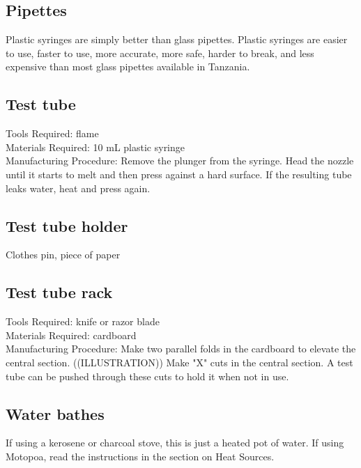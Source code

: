 \subsection{Pipettes}
Plastic syringes are simply better than glass pipettes. Plastic syringes are easier to use, faster to use, more accurate, more safe, harder to break, and less expensive than most glass pipettes available in Tanzania.

\subsection{Test tube}
Tools Required: flame\\
Materials Required: 10 mL plastic syringe\\
Manufacturing Procedure: Remove the plunger from the syringe. Head the nozzle until it starts to melt and then press against a hard surface. If the resulting tube leaks water, heat and press again.

\subsection{Test tube holder}
Clothes pin, piece of paper

\subsection{Test tube rack}
Tools Required: knife or razor blade\\
Materials Required: cardboard\\
Manufacturing Procedure: Make two parallel folds in the cardboard to elevate the central section. ((ILLUSTRATION)) Make "X" cuts in the central section. A test tube can be pushed through these cuts to hold it when not in use.

\subsection{Water bathes}
If using a kerosene or charcoal stove, this is just a heated pot of water. If using Motopoa, read the instructions in the section on Heat Sources.